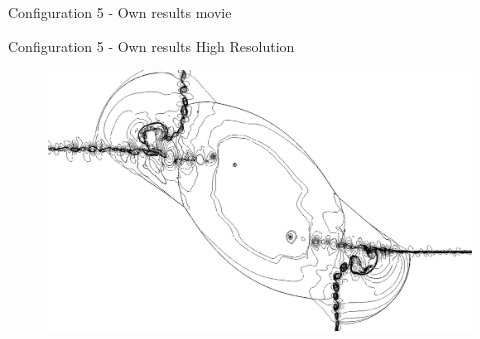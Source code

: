 \begin{frame}{Configuration 5 - Own results}
	movie
\end{frame}

\begin{frame}{Configuration 5 - Own results}
	High Resolution
	
\begin{figure}
\centering
\includegraphics[width=0.7\linewidth]{../../figs/Configuration5_HighRes}
\label{fig:Configuration5_HighRes}
\end{figure}

\end{frame}
	